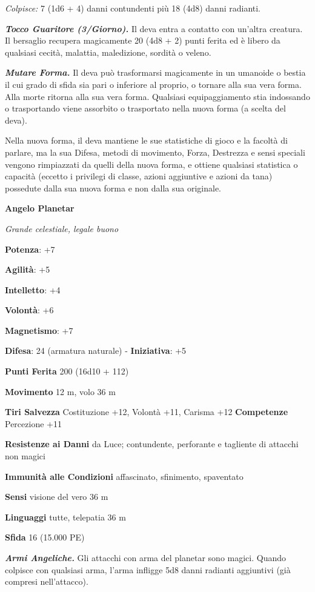 \begin{multicols}{2}
\emph{Colpisce:} 7 (1d6 + 4) danni contundenti più 18 (4d8) danni
radianti.

\emph{\textbf{Tocco Guaritore (3/Giorno).}} Il deva entra a contatto con
un'altra creatura. Il bersaglio recupera magicamente 20 (4d8 + 2) punti
ferita ed è libero da qualsiasi cecità, malattia, maledizione, sordità o
veleno.

\emph{\textbf{Mutare Forma.}} Il deva può trasformarsi magicamente in un
umanoide o bestia il cui grado di sfida sia pari o inferiore al proprio,
o tornare alla sua vera forma. Alla morte ritorna alla sua vera forma.
Qualsiasi equipaggiamento stia indossando o trasportando viene assorbito
o trasportato nella nuova forma (a scelta del deva).

Nella nuova forma, il deva mantiene le sue statistiche di gioco e la
facoltà di parlare, ma la sua Difesa, metodi di movimento, Forza, Destrezza
e sensi speciali vengono rimpiazzati da quelli della nuova forma, e
ottiene qualsiasi statistica o capacità (eccetto i privilegi di classe,
azioni aggiuntive e azioni da tana) possedute dalla sua nuova forma e
non dalla sua originale.

\textbf{Angelo Planetar}

\emph{Grande celestiale, legale buono}

\textbf{Potenza}: +7

\textbf{Agilità}: +5

\textbf{Intelletto}: +4

\textbf{Volontà}: +6

\textbf{Magnetismo}: +7

\textbf{Difesa}: 24 (armatura naturale) - \textbf{Iniziativa}: +5

\textbf{Punti Ferita} 200 (16d10 + 112)

\textbf{Movimento} 12 m, volo 36 m

\textbf{Tiri Salvezza} Costituzione +12, Volontà +11, Carisma +12
\textbf{Competenze} Percezione +11

\textbf{Resistenze ai Danni} da Luce; contundente, perforante e
tagliente di attacchi non magici

\textbf{Immunità alle Condizioni} affascinato, sfinimento, spaventato

\textbf{Sensi} visione del vero 36 m

\textbf{Linguaggi} tutte, telepatia 36 m

\textbf{Sfida} 16 (15.000 PE)

\emph{\textbf{Armi Angeliche.}} Gli attacchi con arma del planetar sono
magici. Quando colpisce con qualsiasi arma, l'arma infligge 5d8 danni
radianti aggiuntivi (già compresi nell'attacco).


\end{multicols}
